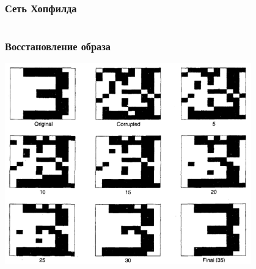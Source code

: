 \documentclass[24pt,pdf,hyperref={unicode}]{beamer}
\begin{document}
\begin{frame}\frametitle{Сеть Хопфилда}
\begin{columns}
\begin{center}
\end{center}


\end{columns}
\end{frame}

\begin{frame}\frametitle{Восстановление образа}
\begin{center}
\includegraphics[width=0.8\textwidth]{Images/HopfieldSample.png}
\end{center}
\end{frame}
\end{document}
